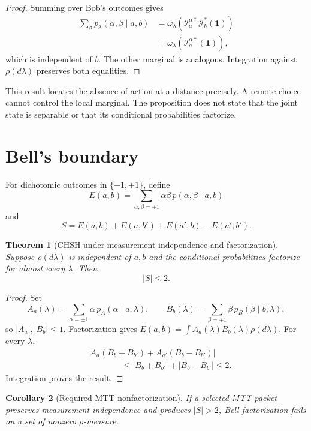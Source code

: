 \documentclass[11pt]{article}
\newcommand{\cI}{\mathcal{I}}
\newcommand{\cJ}{\mathcal{J}}
\newtheorem{theorem}{Theorem}[section]
\newtheorem{corollary}[theorem]{Corollary}
\theoremstyle{remark}
\begin{document}
\begin{proof}
Summing over Bob's outcomes gives
\[
\begin{split}
\sum_\beta p_\lambda(\alpha,\beta\mid a,b)
 &=
\omega_\lambda\!\left(
\cI_{a}^{\alpha\ast}\cJ_b^\ast(\mathbf 1)\right)\\
 &=
\omega_\lambda\!\left(
\cI_{a}^{\alpha\ast}(\mathbf 1)\right),
\end{split}
\]
which is independent of $b$.  The other marginal is analogous.  Integration
against $\rho(d\lambda)$ preserves both equalities.
\end{proof}

This result locates the absence of action at a distance precisely.  A remote
choice cannot control the local marginal.  The proposition does not state
that the joint state is separable or that its conditional probabilities
factorize.

\section{Bell's boundary}
\label{sec:bell}

For dichotomic outcomes in $\{-1,+1\}$, define
\[
 E(a,b)
 =
 \sum_{\alpha,\beta=\pm1}
 \alpha\beta\,p(\alpha,\beta\mid a,b)
\]
and
\[
 S=E(a,b)+E(a,b')+E(a',b)-E(a',b').
\]

\begin{theorem}[CHSH under measurement independence and factorization]
\label{thm:chsh}
Suppose $\rho(d\lambda)$ is independent of $a,b$ and the conditional
probabilities factorize for almost every $\lambda$.  Then
\[
 |S|\leq 2.
\]
\end{theorem}

\begin{proof}
Set
\[
 A_a(\lambda)=\sum_{\alpha=\pm1}\alpha\,
 p_A(\alpha\mid a,\lambda),
\qquad
 B_b(\lambda)=\sum_{\beta=\pm1}\beta\,
 p_B(\beta\mid b,\lambda),
\]
so $|A_a|,|B_b|\leq1$.  Factorization gives
$E(a,b)=\int A_a(\lambda)B_b(\lambda)\rho(d\lambda)$.  For every
$\lambda$,
\[
\begin{split}
 &\left|
 A_a(B_b+B_{b'})
 +A_{a'}(B_b-B_{b'})
 \right|\\
 &\hspace{4em}\leq
 |B_b+B_{b'}|+|B_b-B_{b'}|
 \leq2.
\end{split}
\]
Integration proves the result.
\end{proof}

\begin{corollary}[Required MTT nonfactorization]
\label{cor:required-nonfactorization}
If a selected MTT packet preserves measurement independence and produces
$|S|>2$, Bell factorization fails on a set of nonzero
$\rho$-measure.
\end{corollary}
\end{document}
